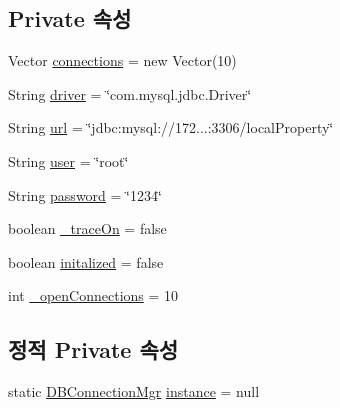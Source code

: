 \subsection*{Private 속성}
\begin{DoxyCompactItemize}
\item 
Vector \mbox{\hyperlink{classcom_1_1github_1_1aites_1_1framework_1_1globalknowledge_1_1_d_b_connection_mgr_a2a178e6371fa020ccca3e12574ef2e14}{connections}} = new Vector(10)
\item 
String \mbox{\hyperlink{classcom_1_1github_1_1aites_1_1framework_1_1globalknowledge_1_1_d_b_connection_mgr_ae64aede762a46e04b709ce1ad37e3956}{driver}} = \char`\"{}com.\+mysql.\+jdbc.\+Driver\char`\"{}
\item 
String \mbox{\hyperlink{classcom_1_1github_1_1aites_1_1framework_1_1globalknowledge_1_1_d_b_connection_mgr_a86e734da035245fae5ee3a77ba92d7a9}{url}} = \char`\"{}jdbc\+:mysql\+://172...\+:3306/local\+Property\char`\"{}
\item 
String \mbox{\hyperlink{classcom_1_1github_1_1aites_1_1framework_1_1globalknowledge_1_1_d_b_connection_mgr_a23c20259e7ddd8b5d7d82aff18db1034}{user}} = \char`\"{}root\char`\"{}
\item 
String \mbox{\hyperlink{classcom_1_1github_1_1aites_1_1framework_1_1globalknowledge_1_1_d_b_connection_mgr_a0c6550844ff29a2f303d7ca3f059d535}{password}} = \char`\"{}1234\char`\"{}
\item 
boolean \mbox{\hyperlink{classcom_1_1github_1_1aites_1_1framework_1_1globalknowledge_1_1_d_b_connection_mgr_ad04eb57480228f70094ba6d17c6879eb}{\+\_\+trace\+On}} = false
\item 
boolean \mbox{\hyperlink{classcom_1_1github_1_1aites_1_1framework_1_1globalknowledge_1_1_d_b_connection_mgr_a4d038fafb28862cec8a799a75f51c565}{initalized}} = false
\item 
int \mbox{\hyperlink{classcom_1_1github_1_1aites_1_1framework_1_1globalknowledge_1_1_d_b_connection_mgr_aee9709978e3b28d13c0f29382aefb70f}{\+\_\+open\+Connections}} = 10
\end{DoxyCompactItemize}
\subsection*{정적 Private 속성}
\begin{DoxyCompactItemize}
\item 
static \mbox{\hyperlink{classcom_1_1github_1_1aites_1_1framework_1_1globalknowledge_1_1_d_b_connection_mgr}{D\+B\+Connection\+Mgr}} \mbox{\hyperlink{classcom_1_1github_1_1aites_1_1framework_1_1globalknowledge_1_1_d_b_connection_mgr_a28a54b9f1a696f0e86227270d54f5d6e}{instance}} = null
\end{DoxyCompactItemize}


